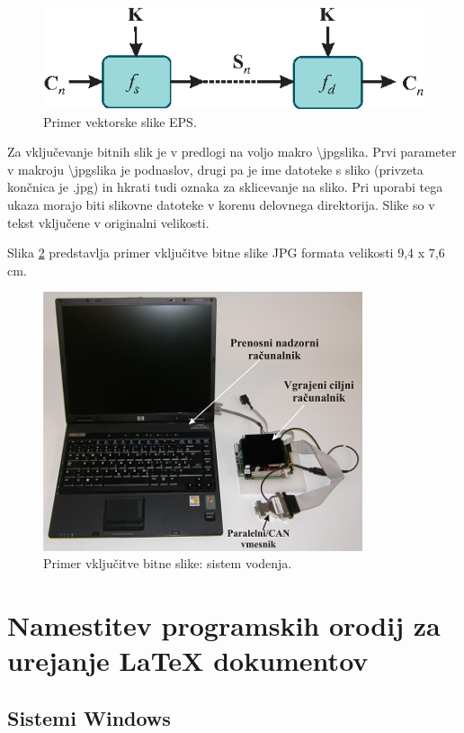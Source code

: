\documentclass[a4paper,twoside,openright,12pt,slovene]{book}
\begin{document}
\begin{figure}[h]
    \centering
    \includegraphics[width=0.75\columnwidth]{Slike/vektorska_slika_2.eps}
    \caption{\label{oblika_signalov_2} Primer vektorske slike EPS.}
\end{figure}

Za vključevanje bitnih slik je v predlogi na voljo makro \textbackslash jpgslika. Prvi parameter v makroju \textbackslash jpgslika je podnaslov, drugi pa je ime datoteke s sliko (privzeta končnica je .jpg) in hkrati tudi oznaka za sklicevanje na sliko. Pri uporabi tega ukaza morajo biti slikovne datoteke v korenu delovnega direktorija. Slike so v tekst vključene v originalni velikosti.

Slika \ref{bitna_slika} predstavlja primer vključitve bitne slike JPG formata velikosti 9,4 x 7,6 cm.

\begin{figure}[h]
    \centering
    \includegraphics[width=9.4cm, height=7.6cm]{Slike/bitna_slika.png}
    \caption{\label{bitna_slika} Primer vključitve bitne slike: sistem vodenja.}
\end{figure}

\chapter{Namestitev programskih orodij za urejanje LaTeX dokumentov} \label{prilogaC}

\section{Sistemi Windows}
\end{document}
